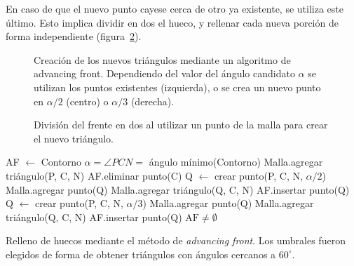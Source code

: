 		En caso de que el nuevo punto cayese cerca de otro ya existente, se utiliza este último.
		Esto implica dividir en dos el hueco, y rellenar cada nueva porción de forma independiente (figura~\ref{fig:af_split}).

		\begin{figure}
			\centering
			
			\caption[Creación de los nuevos triángulos mediante un algoritmo de advancing front]{\label{fig:af_triangle}Creación de los nuevos triángulos
			mediante un algoritmo de advancing front. Dependiendo del valor del
			ángulo candidato $\alpha$ se utilizan los puntos existentes
			(izquierda), o se crea un nuevo punto en $\alpha/2$ (centro) o
			$\alpha/3$ (derecha).}
		\end{figure}

		\begin{figure}
			\centering
			
			\caption[División del frente en dos]{\label{fig:af_split}División del frente en dos
			al utilizar un punto de la malla para crear el nuevo triángulo.}
		\end{figure}

		\begin{algorithm}
			\begin{algorithmic}[1]
					\State AF $\gets$ Contorno
					\Repeat
					\State $\alpha = \angle PCN =$ ángulo mínimo(Contorno)
						\State Malla.agregar triángulo(P, C, N)
						\State AF.eliminar punto(C)
						\State Q $\gets$ crear punto(P, C, N, $\alpha/2$)
						\State Malla.agregar punto(Q)
						\State Malla.agregar triángulo(Q, C, N)
						\State AF.insertar punto(Q)
						\State Q $\gets$ crear punto(P, C, N, $\alpha/3$)
						\State Malla.agregar punto(Q)
						\State Malla.agregar triángulo(Q, C, N)
						\State AF.insertar punto(Q)
					\EndIf
					\Until $\mbox{AF} \neq \emptyset$
				\EndFunction
			\end{algorithmic}
			\caption[Relleno de huecos mediante el método de \emph{advancing front}]{\label{alg:adv_front}Relleno de huecos mediante el método de \emph{advancing front}.
			Los umbrales fueron elegidos de forma de obtener triángulos con ángulos cercanos a $60^{\circ}$.}
		\end{algorithm}

